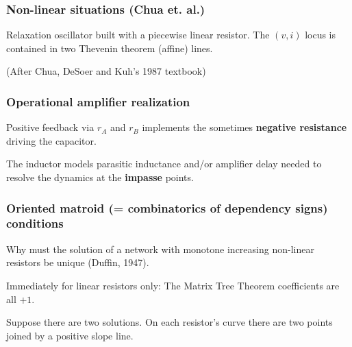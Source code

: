 \documentclass{beamer}
\begin{document}
\begin{frame}
\frametitle{Non-linear situations (Chua et. al.) }
Relaxation oscillator built with a piecewise linear resistor.
The $(v,i)$ locus is contained in two Thevenin theorem (affine) lines.


\begin{minipage}[t]{1.6in}
(After Chua, DeSoer and Kuh's 1987 textbook)
\end{minipage}



\end{frame}

\begin{frame}
\frametitle{Operational amplifier realization}

Positive feedback via $r_A$ and $r_B$ 
implements the sometimes \textbf{negative resistance} driving the capacitor.





\begin{minipage}[b]{1.5in}
The inductor models parasitic inductance and/or amplifier delay needed to
resolve the dynamics at the \textbf{impasse} points.
\end{minipage}


\end{frame}

\begin{frame}
\frametitle{Oriented matroid (= combinatorics of dependency signs) 
conditions}

Why must the solution of a network with monotone 
increasing non-linear resistors be unique (Duffin, 1947).

Immediately for linear resistors only: The Matrix Tree Theorem coefficients
are all $+1$.


Suppose there are two solutions.  On each resistor's curve there are two
points joined by a positive slope line.


\end{frame}
\end{document}
